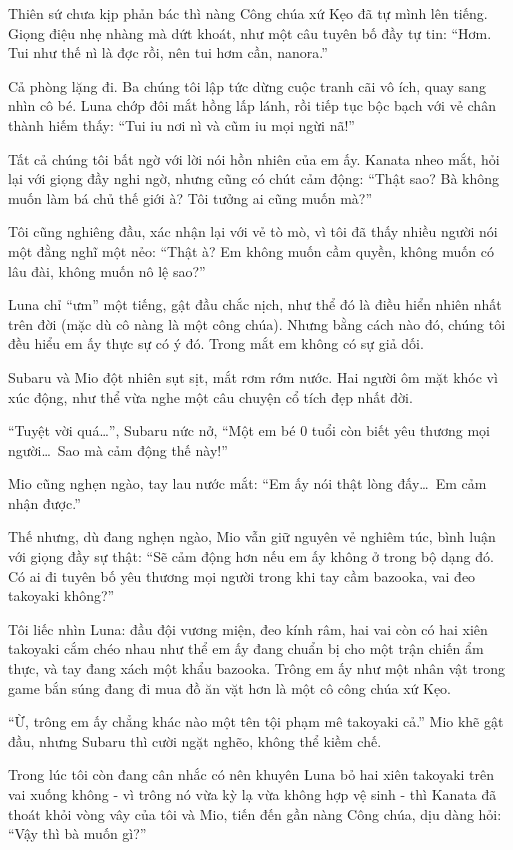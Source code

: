 \documentclass[../main.tex]{subfiles}
\begin{document}
Thiên sứ chưa kịp phản bác thì nàng Công chúa xứ Kẹo đã tự mình lên tiếng. Giọng điệu nhẹ nhàng mà dứt khoát, như một câu tuyên bố đầy tự tin: ``Hơm. Tui như thế nì là đợc rồi, nên tui hơm cần, nanora.''

Cả phòng lặng đi. Ba chúng tôi lập tức dừng cuộc tranh cãi vô ích, quay sang nhìn cô bé. Luna chớp đôi mắt hồng lấp lánh, rồi tiếp tục bộc bạch với vẻ chân thành hiếm thấy: ``Tui iu nơi nì và cũm iu mọi ngừi nã!''

Tất cả chúng tôi bất ngờ với lời nói hồn nhiên của em ấy. Kanata nheo mắt, hỏi lại với giọng đầy nghi ngờ, nhưng cũng có chút cảm động: ``Thật sao? Bà không muốn làm bá chủ thế giới à? Tôi tưởng ai cũng muốn mà?''

Tôi cũng nghiêng đầu, xác nhận lại với vẻ tò mò, vì tôi đã thấy nhiều người nói một đằng nghĩ một nẻo: ``Thật à? Em không muốn cầm quyền, không muốn có lâu đài, không muốn nô lệ sao?''

Luna chỉ ``ưm'' một tiếng, gật đầu chắc nịch, như thể đó là điều hiển nhiên nhất trên đời (mặc dù cô nàng là một công chúa). Nhưng bằng cách nào đó, chúng tôi đều hiểu em ấy thực sự có ý đó. Trong mắt em không có sự giả dối.

Subaru và Mio đột nhiên sụt sịt, mắt rơm rớm nước. Hai người ôm mặt khóc vì xúc động, như thể vừa nghe một câu chuyện cổ tích đẹp nhất đời.


``Tuyệt vời quá\dots'', Subaru nức nở, ``Một em bé 0 tuổi còn biết yêu thương mọi người\dots\ Sao mà cảm động thế này!''

Mio cũng nghẹn ngào, tay lau nước mắt: ``Em ấy nói thật lòng đấy\dots\ Em cảm nhận được.''

Thế nhưng, dù đang nghẹn ngào, Mio vẫn giữ nguyên vẻ nghiêm túc, bình luận với giọng đầy sự thật: ``Sẽ cảm động hơn nếu em ấy không ở trong bộ dạng đó. Có ai đi tuyên bố yêu thương mọi người trong khi tay cầm bazooka, vai đeo takoyaki không?''

Tôi liếc nhìn Luna: đầu đội vương miện, đeo kính râm, hai vai còn có hai xiên takoyaki cắm chéo nhau như thể em ấy đang chuẩn bị cho một trận chiến ẩm thực, và tay đang xách một khẩu bazooka. Trông em ấy như một nhân vật trong game bắn súng đang đi mua đồ ăn vặt hơn là một cô công chúa xứ Kẹo.

``Ừ, trông em ấy chẳng khác nào một tên tội phạm mê takoyaki cả.'' Mio khẽ gật đầu, nhưng Subaru thì cười ngặt nghẽo, không thể kiềm chế.

Trong lúc tôi còn đang cân nhắc có nên khuyên Luna bỏ hai xiên takoyaki trên vai xuống không - vì trông nó vừa kỳ lạ vừa không hợp vệ sinh - thì Kanata đã thoát khỏi vòng vây của tôi và Mio, tiến đến gần nàng Công chúa, dịu dàng hỏi: ``Vậy thì bà muốn gì?''
\end{document}
